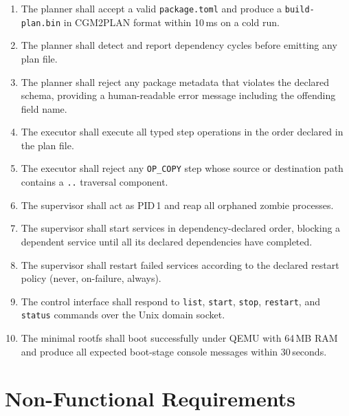 \documentclass[12pt,a4paper]{report}
\begin{document}
\begin{enumerate}[leftmargin=2em, itemsep=3pt]
  \item The planner shall accept a valid \texttt{package.toml} and produce a
        \texttt{build-plan.bin} in CGM2PLAN format within 10\,ms on a cold run.
  \item The planner shall detect and report dependency cycles before emitting any
        plan file.
  \item The planner shall reject any package metadata that violates the declared
        schema, providing a human-readable error message including the offending
        field name.
  \item The executor shall execute all typed step operations in the order declared
        in the plan file.
  \item The executor shall reject any \texttt{OP\_COPY} step whose source or
        destination path contains a \texttt{..} traversal component.
  \item The supervisor shall act as PID\,1 and reap all orphaned zombie processes.
  \item The supervisor shall start services in dependency-declared order, blocking
        a dependent service until all its declared dependencies have completed.
  \item The supervisor shall restart failed services according to the declared
        restart policy (never, on-failure, always).
  \item The control interface shall respond to \texttt{list}, \texttt{start},
        \texttt{stop}, \texttt{restart}, and \texttt{status} commands over the
        Unix domain socket.
  \item The minimal rootfs shall boot successfully under QEMU with 64\,MB RAM
        and produce all expected boot-stage console messages within 30\,seconds.
\end{enumerate}

\section{Non-Functional Requirements}
\end{document}
